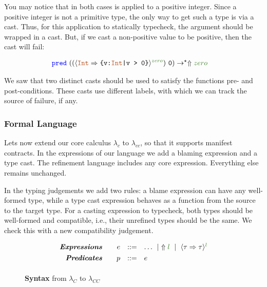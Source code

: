 You may notice that in both cases \prednamep is applied to a 
positive integer.
Since a positive integer is not a primitive type, 
the only way to get such a type is via a cast.
Thus, for this application to statically typecheck, the argument should 
be wrapped in a cast.
But, if we cast a non-positive value to be positive,
then the cast will fail:

\begin{align*}
\predname \ ((\ecast{\tyint}{\ttpos}{zero})\ \texttt{0}) &\rightarrow^\star \elabel{zero}
\end{align*}

We saw that two distinct casts should be used to satisfy the functions pre- and post-conditions.
These casts use different labels, with which we can track the source of failure, if any.

\subsubsection{Formal Language}
Lets now extend our core calculus $\lambda_c$ to $\lambda_{cc}$,
so that it supports manifest contracts.
%
In the expressions of our language we add a blaming expression
and a type cast.
The refinement language includes any core expression.
Everything else remains unchanged.


In the typing judgements we add two rules:
a blame expression can have any well-formed type, 
while a type cast expression behaves as a function from the 
source to the target type.
For a casting expression to typecheck, both types should be 
well-formed and compatible, i.e., their unrefined types should be 
the same. We check this with a new compatibility judgement.

\begin{figure}[ht!]
\centering
$$
\begin{array}{rrcl}
\emphbf{Expressions} \quad 
  & e 
  & ::= 
  & 		 \dots
  \spmid \elabel{l} 
  \spmid \ecast{\tau}{\tau}{l} 
  \\[0.05in] 

\emphbf{Predicates} \quad 
  & p
  & ::= 
  &		e
  \\[0.05in] 

\end{array}
$$
\caption{\textbf{Syntax} from $\lambda_C$ to $\lambda_{CC}$}
\label{fig:syntax}
\end{figure}


